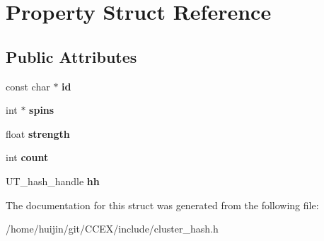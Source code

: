 \hypertarget{structProperty}{\section{Property Struct Reference}
\label{structProperty}
}
\subsection*{Public Attributes}
\begin{DoxyCompactItemize}
\item 
\hypertarget{structProperty_a0fed188887a05506560267d81c4bcc28}{const char $\ast$ {\bfseries id}}\label{structProperty_a0fed188887a05506560267d81c4bcc28}

\item 
\hypertarget{structProperty_a456a794724fc3442acaa18fa265b979b}{int $\ast$ {\bfseries spins}}\label{structProperty_a456a794724fc3442acaa18fa265b979b}

\item 
\hypertarget{structProperty_a990ea1706272bc3752492334d1516a8b}{float {\bfseries strength}}\label{structProperty_a990ea1706272bc3752492334d1516a8b}

\item 
\hypertarget{structProperty_a1fdfdcf6b05b8b6ec055f8944d303687}{int {\bfseries count}}\label{structProperty_a1fdfdcf6b05b8b6ec055f8944d303687}

\item 
\hypertarget{structProperty_a4fffcff3b4bd2f8388f21a444468889b}{U\-T\-\_\-hash\-\_\-handle {\bfseries hh}}\label{structProperty_a4fffcff3b4bd2f8388f21a444468889b}

\end{DoxyCompactItemize}


The documentation for this struct was generated from the following file\-:\begin{DoxyCompactItemize}
\item 
/home/huijin/git/\-C\-C\-E\-X/include/cluster\-\_\-hash.\-h\end{DoxyCompactItemize}

